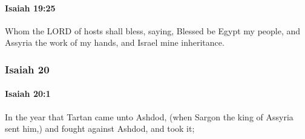 		\paragraph{Isaiah 19:25} %
			\label{ISAIAH-19-25}

			Whom the LORD of hosts shall bless, saying, Blessed be Egypt my people, and Assyria the work of my hands, and Israel mine inheritance.

	\subsubsection{Isaiah 20} %
		\label{ISAIAH-20}

		\paragraph{Isaiah 20:1} %
			\label{ISAIAH-20-1}

			In the year that Tartan came unto Ashdod, (when Sargon the king of Assyria sent him,) and fought against Ashdod, and took it;

